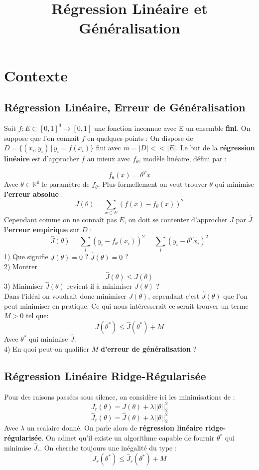 \documentclass[12pt]{article}
\title{Régression Linéaire et Généralisation}
\begin{document}
\maketitle


\section{Contexte}
\subsection{Régression Linéaire, Erreur de Généralisation}
Soit $f: E \subset [0,1]^d \to [0,1]$ une fonction inconnue avec E un ensemble \textbf{fini}.
On suppose que l'on connaît $f$ en quelques points :     
On dispose de $D = \{(x_i,y_i) \, | \, y_i = f(x_i)\}$ fini avec $m = |D| << |E|$.   
Le but de la \textbf{régression linéaire} est d'approcher $f$ au mieux avec $f_\theta$, modèle linéaire, défini par :   

$$ f_\theta(x) = \theta^{T}x$$
Avec $\theta \in \mathbb{R^d}$ le paramètre de $f_\theta$.    
Plus formellement on veut trouver $\theta$ qui minimise \textbf{l'erreur absolue} :   
$$ J(\theta) = \sum_{x \in E} (f(x)-f_\theta(x))^2 $$    
Cependant comme on ne connaît pas $E$, on doit se contenter d'approcher $J$ par $\hat J$ \textbf{l'erreur empirique} sur $D$ :
$$ \hat{J}(\theta) =  \sum_{i} (y_i-f_\theta(x_i))^2 = \sum_{i} (y_i-\theta^{T}x_i)^2 $$ 
1) Que signifie $J(\theta) = 0$ ? $\hat{J}(\theta) = 0$ ?   \\
2) Montrer $$ \hat{J}(\theta) \leq J(\theta)$$     
3) Minimiser $\hat{J}(\theta)$ revient-il à minimiser $J(\theta)$ ?   \\
Dans l'idéal on voudrait donc minimiser $J(\theta)$, cependant c'est $\hat{J}(\theta)$ que l'on peut minimiser en pratique.   
Ce qui nous intéresserait ce serait trouver un terme $M > 0$ tel que:    
$$ J(\theta^*) \leq \hat{J}(\theta^*) + M$$   
Avec $\theta^*$ qui minimise $\hat{J}$.  \\  
4) En quoi peut-on qualifier $M$ \textbf{d'erreur de généralisation} ?
\subsection{Régression Linéaire Ridge-Régularisée}
Pour des raisons passées sous silence, on considère ici les minimisations de : 
$$ J_r(\theta) = J(\theta) + \lambda ||\theta||_2^2 $$
$$\hat{J}_r(\theta) = \hat{J}(\theta) + \lambda ||\theta||_2^2$$   
Avec $\lambda$ un scalaire donné.   
On parle alors de \textbf{régression linéaire ridge-régularisée}.  
On admet qu'il existe un algorithme capable de fournir $\theta^{*}$ qui minimise $\hat{J}_r $.   
On cherche toujours une inégalité du type :   
$$ J_r(\theta^{*}) \leq \hat{J}_r(\theta^{*}) + M$$   
\end{document}
